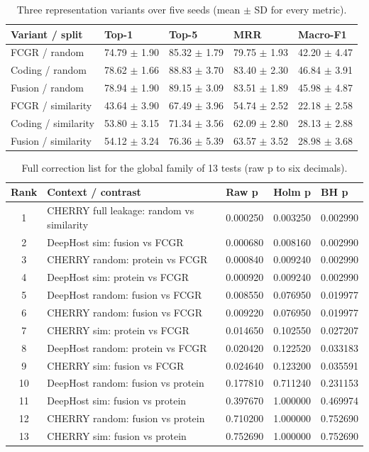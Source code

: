 \documentclass[utf8]{FrontiersinVancouver}
\begin{document}
\begin{table}[ht]
\centering
\renewcommand{\arraystretch}{1.25}
\caption{Three representation variants over five seeds (mean $\pm$ SD for every metric).}\label{tab:5}
\small
\begin{tabular}{l l l l l}
\hline
Variant / split & Top-1 & Top-5 & MRR & Macro-F1 \\
\hline
FCGR / random & 74.79 $\pm$ 1.90 & 85.32 $\pm$ 1.79 & 79.75 $\pm$ 1.93 & 42.20 $\pm$ 4.47 \\
Coding / random & 78.62 $\pm$ 1.66 & 88.83 $\pm$ 3.70 & 83.40 $\pm$ 2.30 & 46.84 $\pm$ 3.91 \\
Fusion / random & 78.94 $\pm$ 1.90 & 89.15 $\pm$ 3.09 & 83.51 $\pm$ 1.89 & 45.98 $\pm$ 4.87 \\
FCGR / similarity & 43.64 $\pm$ 3.90 & 67.49 $\pm$ 3.96 & 54.74 $\pm$ 2.52 & 22.18 $\pm$ 2.58 \\
Coding / similarity & 53.80 $\pm$ 3.15 & 71.34 $\pm$ 3.56 & 62.09 $\pm$ 2.80 & 28.13 $\pm$ 2.88 \\
Fusion / similarity & 54.12 $\pm$ 3.24 & 76.36 $\pm$ 5.39 & 63.57 $\pm$ 3.52 & 28.98 $\pm$ 3.68 \\
\hline
\end{tabular}
\end{table}

\begin{table}[ht]
\centering
\renewcommand{\arraystretch}{1.2}
\caption{Full correction list for the global family of 13 tests (raw p to six decimals).}\label{tab:6}
\footnotesize
\begin{tabular}{c p{6.7cm} l l l}
\hline
Rank & Context / contrast & Raw p & Holm p & BH p \\
\hline
1 & CHERRY full leakage: random vs similarity & 0.000250 & 0.003250 & 0.002990 \\
2 & DeepHost sim: fusion vs FCGR & 0.000680 & 0.008160 & 0.002990 \\
3 & CHERRY random: protein vs FCGR & 0.000840 & 0.009240 & 0.002990 \\
4 & DeepHost sim: protein vs FCGR & 0.000920 & 0.009240 & 0.002990 \\
5 & DeepHost random: fusion vs FCGR & 0.008550 & 0.076950 & 0.019977 \\
6 & CHERRY random: fusion vs FCGR & 0.009220 & 0.076950 & 0.019977 \\
7 & CHERRY sim: protein vs FCGR & 0.014650 & 0.102550 & 0.027207 \\
8 & DeepHost random: protein vs FCGR & 0.020420 & 0.122520 & 0.033183 \\
9 & CHERRY sim: fusion vs FCGR & 0.024640 & 0.123200 & 0.035591 \\
10 & DeepHost random: fusion vs protein & 0.177810 & 0.711240 & 0.231153 \\
11 & DeepHost sim: fusion vs protein & 0.397670 & 1.000000 & 0.469974 \\
12 & CHERRY random: fusion vs protein & 0.710200 & 1.000000 & 0.752690 \\
13 & CHERRY sim: fusion vs protein & 0.752690 & 1.000000 & 0.752690 \\
\hline
\end{tabular}
\end{table}
\end{document}
